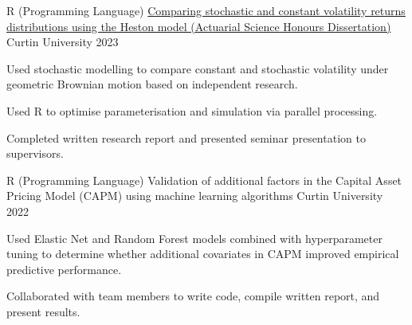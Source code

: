 \begin{cventries}
  \cventry
    {R (Programming Language)} %
    {\href{https://www.researchgate.net/publication/372915363_Comparing_Stochastic_and_Constant_Volatility_Returns_Distributions_using_the_Heston_Model}{Comparing stochastic and constant volatility returns distributions using the Heston model (Actuarial Science Honours Dissertation) \ExternalLink}} %
    {Curtin University} %
    {2023} %
    {
      \begin{cvitems} %
        \item {Used stochastic modelling to compare constant and stochastic volatility under geometric Brownian motion based on independent research.}
        \item {Used R to optimise parameterisation and simulation via parallel processing.}
        \item {Completed written research report and presented seminar presentation to supervisors.}
      \end{cvitems}
    }

  \cventry
    {R (Programming Language)} %
    {Validation of additional factors in the Capital Asset Pricing Model (CAPM) using machine learning algorithms} %
    {Curtin University} %
    {2022} %
    {
      \begin{cvitems} %
        \item {Used Elastic Net and Random Forest models combined with hyperparameter tuning to determine whether additional covariates in CAPM improved empirical predictive performance.}
        \item {Collaborated with team members to write code, compile written report, and present results.}
      \end{cvitems}
    }
\end{cventries}
